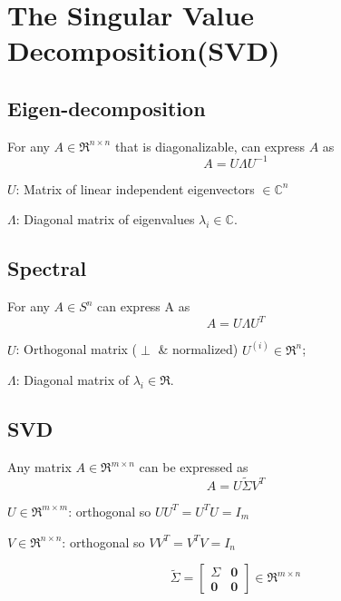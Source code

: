 \section{The Singular Value Decomposition(SVD)}

\subsection{Eigen-decomposition}

For any $A\in \Re^{n\times n}$ that is diagonalizable, can express $A$ as 
\begin{equation*}
A = U\Lambda U^{-1}
\end{equation*}

$U$: Matrix of linear independent eigenvectors $\in \mathbb{C}^n$

$\Lambda$: Diagonal matrix of eigenvalues $\lambda_i\in \mathbb{C}$.

\subsection{Spectral}

For any $A\in S^n$ can express A as
\begin{equation*}
A = U\Lambda U^T
\end{equation*}

$U$: Orthogonal matrix ($\perp$ \& normalized) $U^{(i)}\in \Re^n$;

$\Lambda$: Diagonal matrix of $\lambda_i \in \Re$.

\subsection{SVD}

Any matrix $A\in \Re^{m\times n}$ can be expressed as 
\begin{equation*}
A =U\tilde{\Sigma} V^T
\end{equation*}



$U\in \Re^{m\times m}$: orthogonal so $UU^T =U^TU = I_m$

$V\in \Re^{n\times n}$: orthogonal so $VV^T = V^TV =I_n$

$$\tilde{\Sigma} = 
\left[
\begin{matrix}
\Sigma & \textbf{0}\\
\textbf{0}&\textbf{0}
\end{matrix}
\right]\in \Re^{m\times n}
$$

